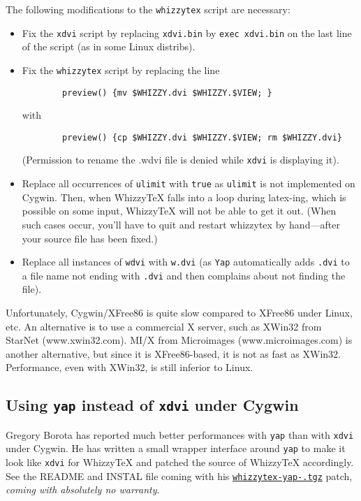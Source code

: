 \documentclass{article}
\def \WhizzyTeX{Whizzy\TeX}
\let \lst \verb
\begin{document}
The following modifications to the \texttt{whizzytex} script are
necessary\iffalse \space
(these have been contributed by Marciano Siniscalchi and Gregory Borota)\fi:
\begin{itemize}

\item 
Fix the \lst"xdvi" script by replacing \lst"xdvi.bin"
by \lst"exec xdvi.bin" on the last line of the script
(as in some Linux distribs).

\item
Fix the  \lst"whizzytex" script by replacing  the line
\begin{verbatim}
        preview() {mv $WHIZZY.dvi $WHIZZY.$VIEW; }
\end{verbatim}
with
\begin{verbatim}
        preview() {cp $WHIZZY.dvi $WHIZZY.$VIEW; rm $WHIZZY.dvi}
\end{verbatim}
(Permission to rename the .wdvi file is denied while
\lst"xdvi" is displaying it).

\item
Replace all occurrences of \texttt{ulimit} with \texttt{true} as
\texttt{ulimit} is not implemented on Cygwin. Then, when {\WhizzyTeX} falls
into a loop during latex-ing, which is possible on some input, {\WhizzyTeX}
will not be able to get it out. (When such cases occur, you'll have to quit
and restart whizzytex by hand---after your source file has been fixed.)

\item
Replace all instances of \texttt{wdvi} with \texttt{w.dvi}
(as \texttt{Yap} automatically  adds \texttt{.dvi} to a file name
not ending with \texttt{.dvi} and then complains about not finding the
file).

\end{itemize}
Unfortunately, Cygwin/XFree86 is quite slow compared to XFree86 under
Linux, etc. An alternative is to use a commercial X server, such as
XWin32 from StarNet (www.xwin32.com). MI/X from Microimages
(www.microimages.com) is another alternative, but since it is
XFree86-based, it is not as fast as XWin32.
Performance, even with XWin32, is still inferior to Linux.

\subsection*{Using \texttt{yap} instead of \texttt{xdvi} under Cygwin}

\def \yaptgz{whizzytex-yap-\YAPVERSION.tgz}
Gregory Borota has reported much better performances with 
\texttt{yap} than with \texttt{xdvi} under Cygwin.
He has written a small wrapper interface around \texttt{yap} to make it look
like \texttt{xdvi} for {\WhizzyTeX} and patched the source of WhizzyTeX
accordingly. See the README and INSTAL file coming with his
\href{\yaptgz}{\texttt{\yaptgz}} patch, 
\emph {coming with absolutely no warranty}. 
\end{document}
